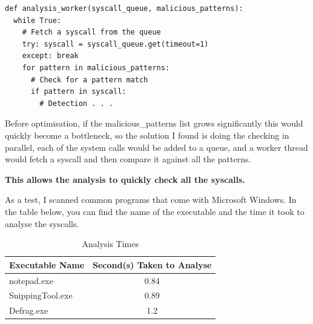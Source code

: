 \begin{lstlisting}
def analysis_worker(syscall_queue, malicious_patterns):
  while True:
    # Fetch a syscall from the queue
    try: syscall = syscall_queue.get(timeout=1)
    except: break
    for pattern in malicious_patterns:
      # Check for a pattern match
      if pattern in syscall:
        # Detection . . .
\end{lstlisting}

Before optimisation, if the malicious\_patterns list grows
significantly this would quickly become a bottleneck,
so the solution I found is doing the checking in parallel,
each of the system calls would be added to a queue,
and a worker thread would fetch a syscall
and then compare it against all the patterns.

\textbf{This allows the analysis to quickly check all the syscalls.}

As a test, I scanned common programs that come with Microsoft Windows.
In the table below, you can find the name of the executable
and the time it took to analyse the syscalls.

\begin{table}[ht]
    \begin{tabular}{|l|c|}
        \hline
        Executable Name & Second(s) Taken to Analyse \\
        \hline
        notepad.exe & 0.84 \\
        \hline
        SnippingTool.exe & 0.89 \\
        \hline
        Defrag.exe & 1.2 \\
        \hline
    \end{tabular}
    \caption{Analysis Times}
    \label{table:analysisTimes}
\end{table}
